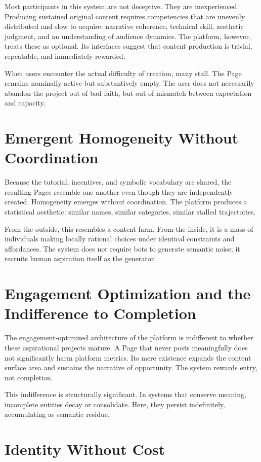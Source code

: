 \documentclass[11pt,oneside]{article}
\begin{document}
Most participants in this system are not deceptive. They are inexperienced. Producing sustained original content requires competencies that are unevenly distributed and slow to acquire: narrative coherence, technical skill, aesthetic judgment, and an understanding of audience dynamics. The platform, however, treats these as optional. Its interfaces suggest that content production is trivial, repeatable, and immediately rewarded.

When users encounter the actual difficulty of creation, many stall. The Page remains nominally active but substantively empty. The user does not necessarily abandon the project out of bad faith, but out of mismatch between expectation and capacity.

\section{Emergent Homogeneity Without Coordination}

Because the tutorial, incentives, and symbolic vocabulary are shared, the resulting Pages resemble one another even though they are independently created. Homogeneity emerges without coordination. The platform produces a statistical aesthetic: similar names, similar categories, similar stalled trajectories.

From the outside, this resembles a content farm. From the inside, it is a mass of individuals making locally rational choices under identical constraints and affordances. The system does not require bots to generate semantic noise; it recruits human aspiration itself as the generator.

\section{Engagement Optimization and the Indifference to Completion}

The engagement-optimized architecture of the platform is indifferent to whether these aspirational projects mature. A Page that never posts meaningfully does not significantly harm platform metrics. Its mere existence expands the content surface area and sustains the narrative of opportunity. The system rewards entry, not completion.

This indifference is structurally significant. In systems that conserve meaning, incomplete entities decay or consolidate. Here, they persist indefinitely, accumulating as semantic residue.

\section{Identity Without Cost}
\end{document}
